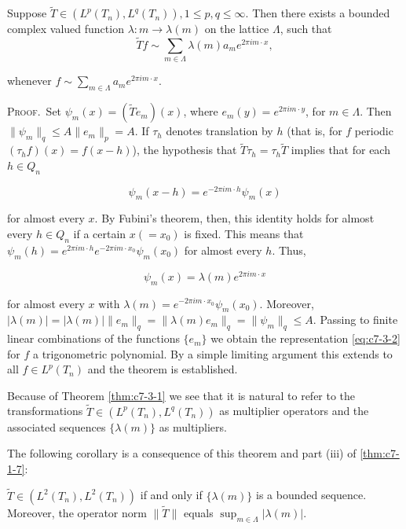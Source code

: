 \begin{theorem}
\label{thm:c7-3-1}
Suppose $\tilde{T} \in (L^p(T_n), L^q(T_n)), 1 \leq p, q \leq \infty$. Then there exists a bounded complex valued function $\lambda: m \to \lambda(m)$ on the lattice $\Lambda$, such that
\begin{equation}\label{eq:c7-3-2}
\tilde{T}f\sim\sum_{m\in\Lambda}\lambda(m)a_{m}e^{2\pi i m\cdot x},
\end{equation}

whenever $f \sim \sum_{m \in \Lambda} a_m e^{2\pi i m \cdot x}$.
\end{theorem}

\textsc{Proof.}\ Set $\psi_m(x) = (\tilde{T} e_m)(x)$, where $e_m(y) = e^{2\pi i m \cdot y}$, for $m \in \Lambda$. Then $\|\psi_m\|_q \leq A \|e_m\|_p = A$. If $\tau_h$ denotes translation by $h$ (that is, for $f$ periodic $(\tau_h f)(x) = f(x - h)$), the hypothesis that $\tilde{T} \tau_h = \tau_h \tilde{T}$ implies that for each $h \in Q_n$

\[
\psi_{m}(x-h)=e^{-2\pi i m\cdot h}\psi_{m}(x)
\]

for almost every $x$. By Fubini's theorem, then, this identity holds for almost every $h \in Q_n$ if a certain $x(= x_0)$ is fixed. This means that $\psi_m(h) = e^{2\pi i m \cdot h} e^{-2\pi i m \cdot x_0} \psi_m(x_0)$ for almost every $h$. Thus,

\[
\psi_{m}(x)=\lambda(m)e^{2\pi i m\cdot x}
\]

for almost every $x$ with $\lambda(m) = e^{-2\pi im \cdot x_0} \psi_m(x_0)$. Moreover, $|\lambda(m)| = |\lambda(m)|\|e_m\|_q = \|\lambda(m)e_m\|_q = \|\psi_m\|_q \leq A$. Passing to finite linear combinations of the functions $\{e_m\}$ we obtain the representation \eqref{eq:c7-3-2} for $f$ a trigonometric polynomial. By a simple limiting argument this extends to all $f \in L^p(T_n)$ and the theorem is established.

Because of Theorem \ref{thm:c7-3-1} we see that it is natural to refer to the transformations $\widetilde{T} \in (L^p(T_n), L^q(T_n))$ as multiplier operators and the associated sequences $\{\lambda(m)\}$ as multipliers.

The following corollary is a consequence of this theorem and part (iii) of \eqref{thm:c7-1-7}:

\begin{corollary}
\label{cor:c7-3-3}
$\tilde{T}\in(L^2(T_n),L^2(T_n))$ if and only if $\{\lambda(m)\}$ is a bounded sequence. Moreover, the operator norm $\|\tilde{T}\|$ equals $\sup_{m\in\Lambda}|\lambda(m)|$.
\end{corollary}

